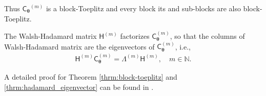 \documentclass[graybox,footinfo]{svmult}
\newcommand{\bm}[1]{\boldsymbol{#1}}
\newcommand{\naturals}{\mathbb{N}}
\newcommand{\vtheta}{{\bm{\theta}}}
\newcommand{\mC}{\mathsf{C}}
\newcommand{\mCtheta}{{\mathsf{C}_{\vtheta}}}
\newcommand{\mLambda}{\mathsf{\Lambda}}
\newcommand{\mH}{\mathsf{H}}
\begin{document}
\begin{itemize}
	Thus $\mCtheta^{(m)}$ is a block-Toeplitz and every block its and sub-blocks are also block-Toeplitz.
	
	
\end{itemize}
\fi


\begin{theorem}
	\label{thrm:hadamard_eigenvector}
	The Walsh-Hadamard matrix $\mH^{(m)}$ factorizes $\mC_{\vtheta}^{(m)}$, so that the columns of Walsh-Hadamard matrix are the eigenvectors of $\mC_{\vtheta}^{(m)}$, i.e.,
	\begin{align*}
	\mH^{(m)} \mC_{\vtheta}^{(m)}  = \mLambda^{(m)} \mH^{(m)}, \quad m \in \naturals. 
	\end{align*}
\end{theorem}

A detailed proof for Theorem \ref{thrm:block-toeplitz} and \ref{thrm:hadamard_eigenvector} can be found in \cite{JagThesis19a}.
\end{document}

